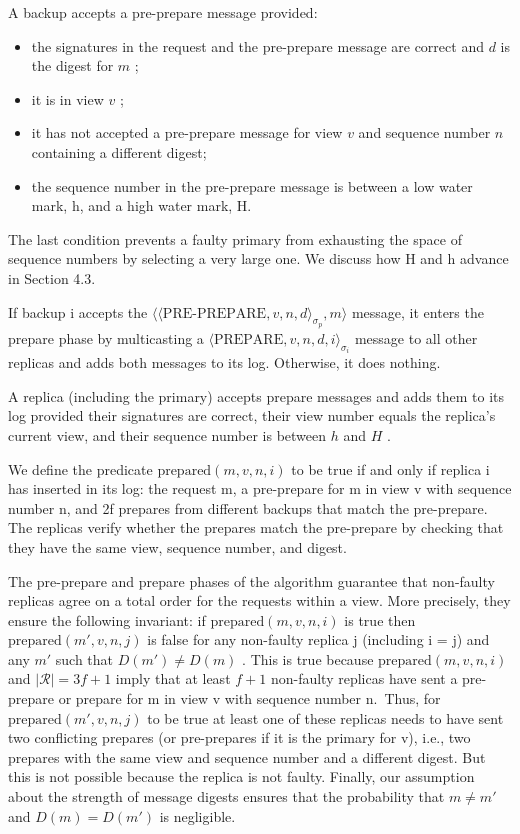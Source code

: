 \documentclass[
]{article}
\providecommand{\tightlist}{%
  \setlength{\itemsep}{0pt}\setlength{\parskip}{0pt}}
\begin{document}
A backup accepts a pre-prepare message provided:

\begin{itemize}
\tightlist
\item
  the signatures in the request and the pre-prepare message are correct
  and \(d\) is the digest for \(m\) ;\\
\item
  it is in view \(v\) ;\\
\item
  it has not accepted a pre-prepare message for view \(v\) and sequence
  number \(n\) containing a different digest;\\
\item
  the sequence number in the pre-prepare message is between a low water
  mark, h, and a high water mark, H.
\end{itemize}

The last condition prevents a faulty primary from exhausting the space
of sequence numbers by selecting a very large one. We discuss how H and
h advance in Section 4.3.

If backup i accepts the
\(\langle\langle\text{PRE-PREPARE},v,n,d\rangle_{\sigma_{p}},m\rangle\)
message, it enters the prepare phase by multicasting a
\(\langle\text{PREPARE},v,n,d,i\rangle_{\sigma_{i}}\) message to all
other replicas and adds both messages to its log. Otherwise, it does
nothing.

A replica (including the primary) accepts prepare messages and adds them
to its log provided their signatures are correct, their view number
equals the replica's current view, and their sequence number is between
\(h\) and \(H\) .

We define the predicate \(\text{prepared}(m, v, n, i)\) to be true if
and only if replica i has inserted in its log: the request m, a
pre-prepare for m in view v with sequence number n, and 2f prepares from
different backups that match the pre-prepare. The replicas verify
whether the prepares match the pre-prepare by checking that they have
the same view, sequence number, and digest.

The pre-prepare and prepare phases of the algorithm guarantee that
non-faulty replicas agree on a total order for the requests within a
view. More precisely, they ensure the following invariant: if
\(\text{prepared}(m, v, n, i)\) is true then
\(\text{prepared}(m', v, n, j)\) is false for any non-faulty replica j
(including i = j) and any \(m'\) such that \(D(m') \neq D(m)\) . This is
true because \(\text{prepared}(m, v, n, i)\) and
\(|\mathcal{R}| = 3f + 1\) imply that at least \(f + 1\) non-faulty
replicas have sent a pre-prepare or prepare for m in view v with
sequence number n.~Thus, for \(\text{prepared}(m', v, n, j)\) to be true
at least one of these replicas needs to have sent two conflicting
prepares (or pre-prepares if it is the primary for v), i.e., two
prepares with the same view and sequence number and a different digest.
But this is not possible because the replica is not faulty. Finally, our
assumption about the strength of message digests ensures that the
probability that \(m \neq m'\) and \(D(m) = D(m')\) is negligible.
\end{document}

